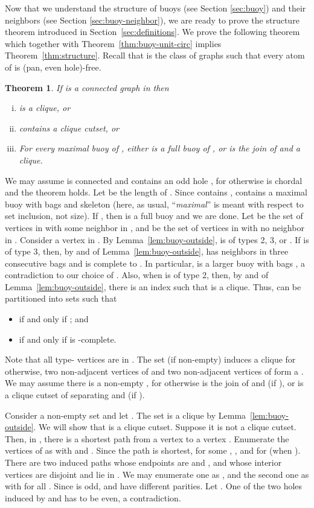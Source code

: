 \documentclass[11pt,a4paper]{article}
\newtheorem{theorem} {Theorem}[section]
\newenvironment{proof}{\noindent {\it Proof:~}}{\hfill \smallskip\par}
\begin{document}
Now that we understand the structure of buoys (see Section
\ref{sec:buoy}) and their neighbors (see Section
\ref{sec:buoy-neighbor}), we are ready to prove the structure
theorem introduced in Section~\ref{sec:definitions}. We prove the
following  theorem which together with
Theorem~\ref{thm:buoy-unit-circ} implies
Theorem~\ref{thm:structure}. Recall that  is the class
of graphs  such that every atom of  is (pan, even
hole)-free.
\begin{theorem}\label{thm:structure_buoy}
If  is a connected graph in  then
\begin{enumerate}[(i)]
 \item  is a clique, or
 \item  contains a clique cutset, or
 \item For every maximal buoy  of , either  is a full
 buoy of , or  is the join of  and a clique.
\end{enumerate}
\end{theorem}
\begin{proof}
We may assume  is connected and contains an odd hole , for
otherwise  is chordal and the theorem holds. Let  be the
length of . Since  contains ,  contains a maximal buoy
 with bags  and skeleton 
(here, as usual, ``\emph{maximal}'' is meant with respect to set
inclusion, not size). If , then  is a full
buoy and we are done. Let  be the set of vertices in 
with some neighbor in , and  be the set of vertices in 
with no neighbor in . Consider a vertex  in . By
Lemma~\ref{lem:buoy-outside},  is of types 2, 3, or . If
 is of type 3, then, by  and  of
Lemma~\ref{lem:buoy-outside},  has neighbors in three
consecutive bags  and is complete to .
In particular,  is a larger buoy with bags , a contradiction to our choice of . Also, when  is of
type 2, then, by  and   of
Lemma~\ref{lem:buoy-outside}, there is an index  such that
 is a clique. Thus,  can be
partitioned into sets  such that
\begin{itemize}
\item  if and only if ;
and \item  if and only if  is -complete.
\end{itemize}

Note that all type- vertices are in . The set  (if
non-empty) induces a clique for otherwise,  two non-adjacent
vertices of  and  two non-adjacent vertices of  form a
. We may assume there is a non-empty , for otherwise 
is the join of  and  (if ), or   is a
clique cutset of  separating  and  (if ).

Consider a non-empty set  and let . The set  is a clique by Lemma~\ref{lem:buoy-outside}. We
will show that  is a clique cutset. Suppose it is not a clique
cutset. Then, in , there is a shortest path  from a vertex
 to a vertex .
Enumerate the vertices of  as  with  and . Since the path is shortest,  for some , ,  and  for  (when ). There are two induced paths
whose endpoints are  and , and whose interior
vertices are disjoint and lie in . We may enumerate one as , and the second one as  with  for all .
Since  is odd,   and  have different parities. Let
. One of the two holes induced by 
and  has to be even, a contradiction.
\end{proof}
\end{document}
